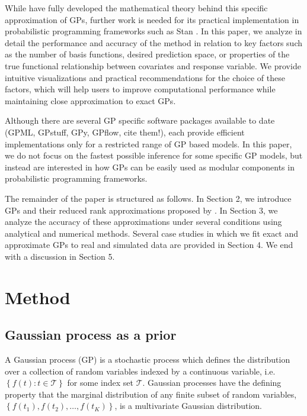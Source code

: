 \documentclass[]{interact}
\theoremstyle{plain}%
\theoremstyle{definition}
\theoremstyle{remark}
\begin{document}
While \citet{solin2018hilbert} have fully developed the mathematical theory behind this specific approximation of GPs, further work is needed for its practical implementation in probabilistic programming frameworks such as Stan \citep{carpenter2017stan}. In this paper, we analyze in detail the performance and accuracy of the method in relation to key factors such as the number of basis functions, desired prediction space, or properties of the true functional relationship between covariates and response variable. We provide intuitive visualizations and practical recommendations for the choice of these factors, which will help users to improve computational performance while maintaining close approximation to exact GPs. 

Although there are several GP specific software packages available to date (GPML, GPstuff, GPy, GPflow, cite them!), each provide efficient implementations only for a restricted range of GP based models. In this paper, we do not focus on the fastest possible inference for some specific GP models, but instead are interested in how GPs can be easily used as modular components in probabilistic programming frameworks. 

The remainder of the paper is structured as follows. In Section 2, we introduce GPs and their reduced rank approximations proposed by \cite{solin2018hilbert}. In Section 3, we analyze the accuracy of these approximations under several conditions using analytical and numerical methods. Several case studies in which we fit
exact and approximate GPs to real and simulated data are provided in Section 4. We end with a discussion in Section 5.


\vspace{3mm}
\section{Method}\label{sec:bf_method}

\subsection{Gaussian process as a prior}

A Gaussian process (GP) is a stochastic process which defines the distribution over a collection of random variables indexed by a continuous variable, i.e. $\left\lbrace f(t): t \in \mathcal{T}\right\rbrace$ for some index set $\mathcal{T}$. Gaussian processes have the defining property that the marginal distribution of any finite subset of random variables, $\left\lbrace f(t_1), f(t_2), \hdots, f(t_K) \right\rbrace$, is a multivariate Gaussian distribution.
\end{document}
